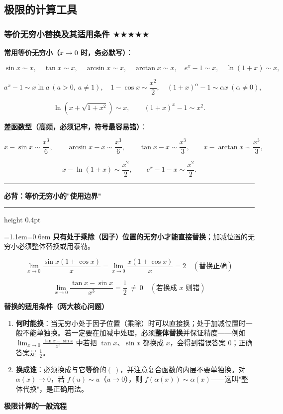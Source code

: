 \documentclass[11pt,openany,UTF8]{ctexbook}
\newcommand{\callouthead}[2]{%
  \par\addvspace{7pt}\noindent
  {\color{#1}\rule[-0.15em]{3pt}{1.05em}}\hspace{0.5em}%
  {\bfseries\color{#1}#2}\par\nobreak\vspace{-0.35em}%
  {\color{rulesep}\hrule height 0.4pt}\nobreak\vspace{0.45em}%
  \begingroup\small\setlength{\parindent}{0pt}%
  \leftskip=1.1em\rightskip=0.6em\noindent\ignorespaces}
\newcommand{\calloutend}{\par\endgroup\addvspace{7pt}}
\newenvironment{callkey}[1]{\callouthead{keybar}{#1}}{\calloutend}
\begin{document}
\subsection{极限的计算工具}

\subsubsection{等价无穷小替换及其适用条件 $\bigstar$$\bigstar$$\bigstar$$\bigstar$$\bigstar$}

\textbf{常用等价无穷小（$x\to 0$ 时，务必默写）}：

\[\sin x\sim x,\quad \tan x\sim x,\quad \arcsin x\sim x,\quad \arctan x\sim x,\quad e^{x}-1\sim x,\quad \ln(1+x)\sim x,\]

\[a^{x}-1\sim x\ln a\ (a>0,\ a\ne 1),\quad 1-\cos x\sim\frac{x^2}{2},\quad (1+x)^{\alpha}-1\sim\alpha x\ (\alpha\ne 0),\]

\[\ln\!\left(x+\sqrt{1+x^2}\right)\sim x,\qquad (1+x)^{x}-1\sim x^{2}.\]

\textbf{差函数型（高频，必须记牢，符号最容易错）}：

\[x-\sin x\sim\frac{x^{3}}{6},\qquad \arcsin x-x\sim\frac{x^{3}}{6},\qquad \tan x-x\sim\frac{x^{3}}{3},\qquad x-\arctan x\sim\frac{x^{3}}{3},\]

\[x-\ln(1+x)\sim\frac{x^{2}}{2},\qquad e^{x}-1-x\sim\frac{x^{2}}{2}.\]

\begin{callkey}{必背：等价无穷小的"使用边界"}
\textbf{只有处于乘除（因子）位置的无穷小才能直接替换}；加减位置的无穷小必须整体替换或用泰勒。

\[\lim_{x\to 0}\frac{\sin x(1+\cos x)}{x}=\lim_{x\to 0}\frac{x(1+\cos x)}{x}=2\quad(\text{替换正确})\]

\[\lim_{x\to 0}\frac{\tan x-\sin x}{x^{3}}=\frac12\ \ne\ 0\quad(\text{若换成 } x \text{ 则错})\]

\end{callkey}

\textbf{替换的适用条件（两大核心问题）}

\begin{enumerate}
\item \textbf{何时能换}：当无穷小处于因子位置（乘除）时可以直接换；处于加减位置时一般不能单独换。若一定要在加减中处理，必须\textbf{整体替换}并保证精度——例如 $\lim_{x\to 0}\frac{\tan x-\sin x}{x^3}$ 中若把 $\tan x$、$\sin x$ 都换成 $x$，会得到错误答案 $0$；正确答案是 $\frac12$。
\item \textbf{换成谁}：必须换成与它\textbf{等价}的$(\ )$，并注意复合函数的内层不要单独换。对 $\alpha(x)\to 0$，若 $f(u)\sim u$（$u\to 0$），则 $f(\alpha(x))\sim\alpha(x)$——这叫"整体代换"，是正确用法。
\end{enumerate}
\textbf{极限计算的一般流程}
\end{document}
